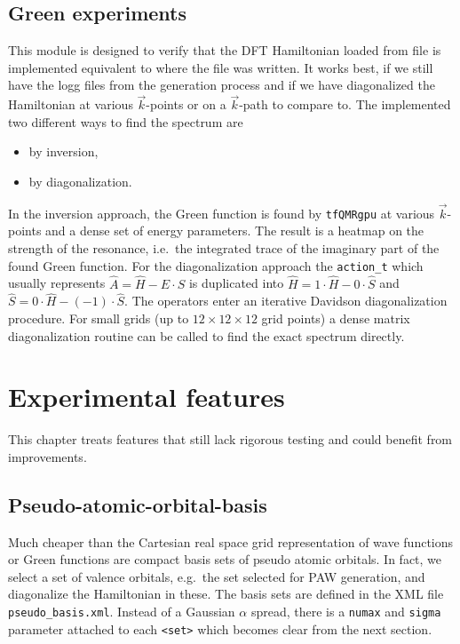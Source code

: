 \documentclass[oribibl]{llncs}
\newcommand{\ttt}[1]{\texttt{#1}}
\begin{document}
\subsection{Green experiments} \label{sec:green-experiments}
This module is designed to verify that the \ac{DFT} Hamiltonian loaded from file is implemented equivalent to
where the file was written.
It works best, if we still have the logg files from the generation process and if we have diagonalized the Hamiltonian at various $\vec{k}$-points or on a $\vec{k}$-path to compare to.
The implemented two different ways to find the spectrum are
\begin{itemize}
  \item by inversion,
  \item by diagonalization.
\end{itemize}
In the inversion approach, the Green function is found by \ttt{tfQMRgpu} at various $\vec{k}$-points and a dense set of energy parameters.
The result is a heatmap on the strength of the resonance, i.e.~the integrated trace of the imaginary part of the found Green function.
For the diagonalization approach the \ttt{action\_t} which usually represents $\hat A = \hat H - E\cdot \hat S$ is duplicated into $\hat H = 1\cdot \hat H - 0\cdot\hat S$ and $\hat S = 0\cdot \hat H - (-1)\cdot\hat S$.
The operators enter an iterative Davidson diagonalization procedure. For small grids (up to $12 \times 12 \times 12$ grid points) a dense matrix diagonalization routine can be called to find the exact spectrum directly.


\newpage
%

\section{Experimental features}
This chapter treats features that still lack rigorous testing and could benefit from improvements.

\subsection{Pseudo-atomic-orbital-basis}
Much cheaper than the Cartesian real space grid representation of wave functions or Green functions
are compact basis sets of pseudo atomic orbitals.
In fact, we select a set of valence orbitals, e.g.~the set selected for \ac{PAW} generation,
and diagonalize the Hamiltonian in these.
The basis sets are defined in the \ac{XML} file \ttt{pseudo\_basis.xml}.
Instead of a Gaussian $\alpha$ spread, there is a \ttt{numax} and \ttt{sigma} parameter attached to each \ttt{<set>} which becomes clear from the next section.
\end{document}

